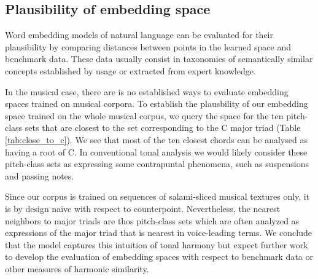 
\subsection{Plausibility of embedding space}

Word embedding models of natural language can be evaluated for their plausibility by comparing distances between points in the learned space and benchmark data. These data usually consist in taxonomies of semantically similar concepts established by usage or extracted from expert knowledge. 

In the musical case, there are is no established ways to evaluate embedding spaces trained on musical corpora. To establish the plausbility of our embedding space trained on the whole musical corpus, we query the space for the ten pitch-class sets that are closest to the set corresponding to the C major triad (Table \ref{tab:close_to_c}). We see that most of the ten closest chords can be analysed as having a root of C. In conventional tonal analysis we would likely consider these pitch-class sets as expressing some contrapuntal phenomena, such as suspensions and passing notes.

Since our corpus is trained on sequences of salami-sliced musical textures only, it is by design na\"{i}ve with respect to counterpoint. Nevertheless, the nearest neighbors to major triads are thos pitch-class sets which are often analyzed as expressions of the major triad that is nearest in voice-leading terms. We conclude that the model captures this intuition of tonal harmony but expect further work to develop the evaluation of embedding spaces with respect to benchmark data or other measures of harmonic similarity.  


